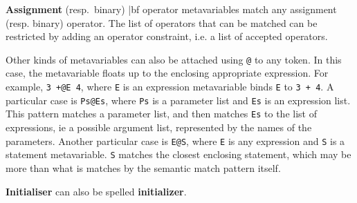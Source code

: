 {\bf Assignment} (resp.~binary) {|bf operator} metavariables match any
assignment (resp. binary) operator. The list of operators that can be
matched can be restricted by adding an operator constraint, i.e. a list of
accepted operators.

Other kinds of metavariables can also be attached using \texttt{@} to any
token.  In this case, the metavariable floats up to the enclosing
appropriate expression.  For example, {\tt 3 +@E 4}, where {\tt E} is an
expression metavariable binds {\tt E} to {\tt 3 + 4}.  A particular case is
{\tt Ps@Es}, where {\tt Ps} is a parameter list and {\tt Es} is an
expression list.  This pattern matches a parameter list, and then matches
{\tt Es} to the list of expressions, ie a possible argument list,
represented by the names of the parameters.  Another particular case is
{\tt E@S}, where {\tt E} is any expression and {\tt S} is a statement
metavariable.  {\tt S} matches the closest enclosing statement, which may
be more than what is matches by the semantic match pattern itself.

{\bf Initialiser} can also be spelled {\bf initializer}.

\begin{grammar}


    









\end{grammar}

